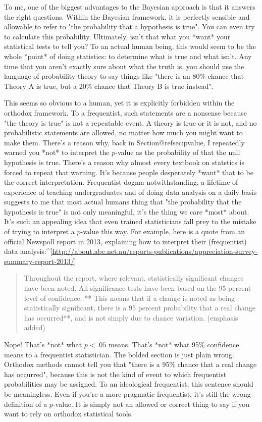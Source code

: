 To me, one of the biggest advantages to the Bayesian approach is that it answers the right questions. Within the Bayesian framework, it is perfectly sensible and allowable to refer to "the probability that a hypothesis is true". You can even try to calculate this probability. Ultimately, isn't that what you *want* your statistical tests to tell you? To an actual human being, this would seem to be the whole *point* of doing statistics: to determine what is true and what isn't. Any time that you aren't exactly sure about what the truth is, you should use the language of probability theory to say things like "there is an 80\% chance that Theory A is true, but a 20\% chance that Theory B is true instead". 

This seems so obvious to a human, yet it is explicitly forbidden within the orthodox framework. To a frequentist, such statements are a nonsense because "the theory is true" is not a repeatable event. A theory is true or it is not, and no probabilistic statements are allowed, no matter how much you might want to make them. There's a reason why, back in Section@refsec:pvalue, I repeatedly warned you *not* to interpret the $p$-value as the probability of that the null hypothesis is true. There's a reason why almost every textbook on statstics is forced to repeat that warning. It's because people desperately *want* that to be the correct interpretation. Frequentist dogma notwithstanding, a lifetime of experience of teaching undergraduates and of doing data analysis on a daily basis suggests to me that most actual humans thing that "the probability that the hypothesis is true" is not only meaningful, it's the thing we care *most* about. It's such an appealing idea that even trained statisticians fall prey to the mistake of trying to interpret a $p$-value this way. For example, here is a quote from an official Newspoll report in 2013, explaining how to interpret their (frequentist) data analysis:^[\url{http://about.abc.net.au/reports-publications/appreciation-survey-summary-report-2013/]}
\begin{quote}
Throughout the report, where relevant, statistically significant changes have been noted. All significance tests have been based on the 95 percent level of confidence. ** This means that if a change is noted as being statistically significant, there is a 95 percent probability that a real change has occurred**, and is not simply due to chance variation. (emphasis added)
\end{quote}
Nope! That's *not* what $p<.05$ means. That's *not* what 95\% confidence means to a frequentist statistician. The bolded section is just plain wrong. Orthodox methods cannot tell you that "there is a 95\% chance that a real change has occurred", because this is not the kind of event to which frequentist probabilities may be assigned. To an ideological frequentist, this sentence should be meaningless. Even if you're a more pragmatic frequentist, it's still the wrong definition of a $p$-value. It is simply not an allowed or correct thing to say if you want to rely on orthodox statistical tools. 

